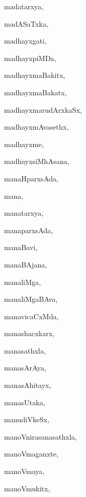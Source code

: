 \begin{multicols}{3}
{\noindent
{madatarxya}, \pageref{madatarxya}

\noindent
{madASaTxka}, \pageref{madASaTxka}

\noindent
{madhayxgati}, \pageref{madhayxgati}

\noindent
{madhayxpiMDa}, \pageref{madhayxpiMDa}

\noindent
{madhayxmaBakitx}, \pageref{madhayxmaBakitx}

\noindent
{madhayxmaBakatx}, \pageref{madhayxmaBakatx}

\noindent
{madhayxmarudArxkaSx}, \pageref{madhayxmarudArxkaSx}

\noindent
{madhayxmAvasethx}, \pageref{madhayxmAvasethx}

\noindent
{madhayxme}, \pageref{madhayxme}

\noindent
{madhayxsiMhAsana}, \pageref{madhayxsiMhAsana}

\noindent
{manaHparxsAda}, \pageref{manaHparxsAda}

\noindent
{mana}, \pageref{mana}

\noindent
{manatarxya}, \pageref{manatarxya}

\noindent
{manaparxsAda}, \pageref{manaparxsAda}

\noindent
{manaBavi}, \pageref{manaBavi}

\noindent
{manaBAjana}, \pageref{manaBAjana}

\noindent
{manaliMga}, \pageref{manaliMga}

\noindent
{manaliMgaBAva}, \pageref{manaliMgaBAva}

\noindent
{manavicaCxMda}, \pageref{manavicaCxMda}

\noindent
{manashacxkarx}, \pageref{manashacxkarx}

\noindent
{manasathxla}, \pageref{manasathxla}

\noindent
{manasArAya}, \pageref{manasArAya}

\noindent
{manasAhitayx}, \pageref{manasAhitayx}

\noindent
{manasUtaka}, \pageref{manasUtaka}

\noindent
{manudiVkeSx}, \pageref{manudiVkeSx}

\noindent
{manoVnirasanasathxla}, \pageref{manoVnirasanasathxla}

\noindent
{manoVmaganxte}, \pageref{manoVmaganxte}

\noindent
{manoVmaya}, \pageref{manoVmaya}

\noindent
{manoVmukitx}, \pageref{manoVmukitx}

}
\end{multicols}
